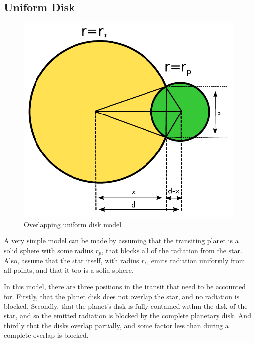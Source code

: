 \subsection{Uniform Disk}
\begin{figure}
    \centering
    \includegraphics[width=\columnwidth]{images/uniform_disk_overlap.pdf}
    \caption{Overlapping uniform disk model}
    \label{fig:uniform_overlap}
\end{figure}

A very simple model can be made by assuming that the transiting planet is a solid sphere with some radius $r_p$, that blocks all of the radiation from the star. Also, assume that the star itself, with radius $r_*$, emits radiation uniformly from all points, and that it too is a solid sphere.

In this model, there are three positions in the transit that need to be accounted for. Firstly, that the planet disk does not overlap the star, and no radiation is blocked. Secondly, that the planet's disk is fully contained within the disk of the star, and so the emitted radiation is blocked by the complete planetary disk. And thirdly that the disks overlap partially, and some factor less than during a complete overlap is blocked.

